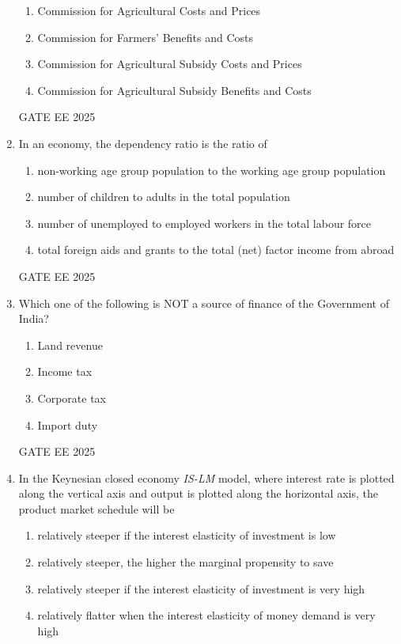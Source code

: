 \documentclass[journal,12pt,onecolumn]{IEEEtran}
\theoremstyle{remark}
\begin{document}
\begin{enumerate}
    \begin{enumerate}[label=(\Alph*)]
    \item Commission for Agricultural Costs and Prices
    \item Commission for Farmers’ Benefits and Costs
    \item Commission for Agricultural Subsidy Costs and Prices
    \item Commission for Agricultural Subsidy Benefits and Costs
    \end{enumerate}
GATE EE 2025\\
\item In an economy, the dependency ratio is the ratio of
    \begin{enumerate}[label=(\Alph*)]
    \item non-working age group population to the working age group population
    \item number of children to adults in the total population
    \item number of unemployed to employed workers in the total labour force
    \item total foreign aids and grants to the total (net) factor income from abroad
    \end{enumerate}
GATE EE 2025\\
\item Which one of the following is NOT a source of finance of the Government of India?
    \begin{enumerate}[label=(\Alph*)]
    \item Land revenue
    \item Income tax
    \item Corporate tax
    \item Import duty
    \end{enumerate}
GATE EE 2025\\
\item In the Keynesian closed economy \textit{IS-LM} model, where interest rate is plotted along the vertical axis and output is plotted along the horizontal axis, the product market schedule will be
    \begin{enumerate}[label=(\Alph*)]
    \item relatively steeper if the interest elasticity of investment is low
    \item relatively steeper, the higher the marginal propensity to save
    \item relatively steeper if the interest elasticity of investment is very high
    \item relatively flatter when the interest elasticity of money demand is very high

\end{enumerate}
\end{enumerate}
\end{document}

